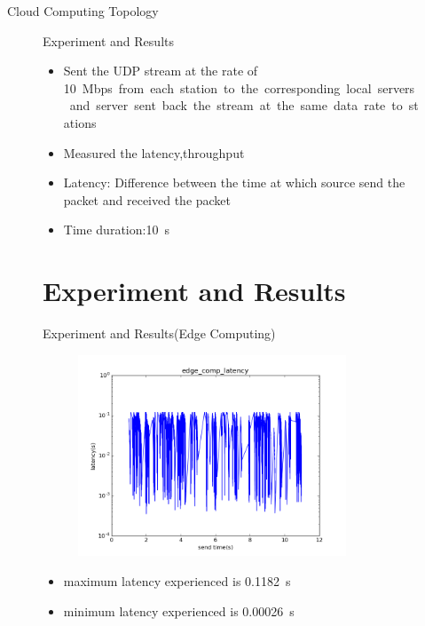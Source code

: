 \documentclass{beamer}
\begin{document}
\begin{frame}{Cloud Computing Topology}
\begin{figure}
\begin{frame}{Experiment and Results}
\begin{itemize}
	\item Sent the UDP stream at the rate of \SI{10}Mbps from each station to the corresponding local servers and server sent back the stream at the same data rate to stations
	\item Measured the latency,throughput
	\item Latency: Difference between the time at which source send the packet and received the packet
	\item Time duration:\SI{10}{\second}
\end{itemize}
\end{frame}
\section{Experiment and Results}
\begin{frame}{Experiment and Results\big(Edge Computing\big)}
\begin{figure}
\includegraphics[width=8cm, height=6cm]{edgecomp_26}
\centering
\end{figure}
\begin{itemize}
	\item maximum latency experienced is \SI{.1182}{\second}
	\item minimum latency experienced is \SI{.00026}{\second} 
\end{itemize}

\end{frame}

\end{figure}
\end{frame}
\end{document}
